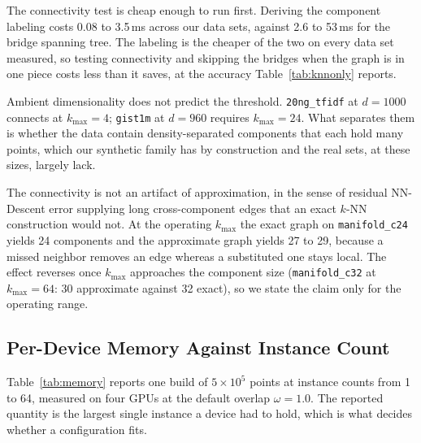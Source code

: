 \documentclass{ieeeaccess}
\newcommand{\kmax}{k_{\max}}
\begin{document}
The connectivity test is cheap enough to run first. Deriving the component
labeling costs 0.08 to 3.5\,ms across our data sets, against 2.6 to 53\,ms for
the bridge spanning tree. The labeling is the cheaper of the two on every data
set measured, so testing connectivity and skipping the bridges when the graph is
in one piece costs less than it saves, at the accuracy Table~\ref{tab:knnonly}
reports.

Ambient dimensionality does not predict the threshold. \texttt{20ng\_tfidf} at
$d = 1000$ connects at $\kmax = 4$; \texttt{gist1m} at $d = 960$ requires
$\kmax = 24$. What separates them is whether the data contain density-separated
components that each hold many points, which our synthetic family has by
construction and the real sets, at these sizes, largely lack.

The connectivity is not an artifact of approximation, in the sense of residual
NN-Descent error supplying long cross-component edges that an exact $k$-NN
construction would not. At the operating $\kmax$ the exact graph on
\texttt{manifold\_c24} yields 24 components and the approximate graph yields 27
to 29, because a missed neighbor removes an edge whereas a substituted one stays
local. The effect reverses once $\kmax$ approaches the component size
(\texttt{manifold\_c32} at $\kmax = 64$: 30 approximate against 32 exact), so we
state the claim only for the operating range.

\subsection{Per-Device Memory Against Instance Count}
\label{sec:memory}

Table~\ref{tab:memory} reports one build of $5\times10^5$ points at instance
counts from 1 to 64, measured on four GPUs at the default overlap
$\omega = 1.0$. The reported quantity is the largest single instance a device had
to hold, which is what decides whether a configuration fits.
\end{document}
